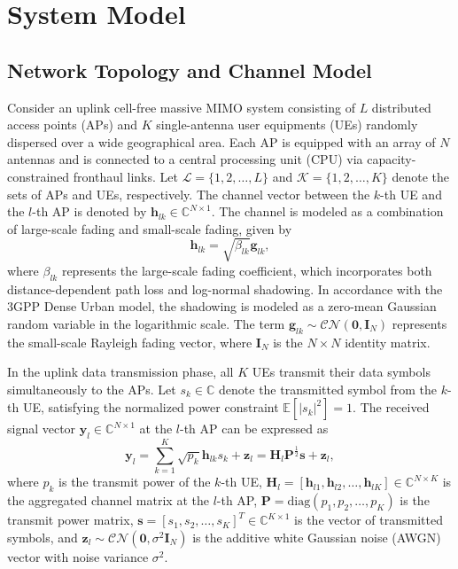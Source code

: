 \section{System Model}

\subsection{Network Topology and Channel Model}
Consider an uplink cell-free massive MIMO system consisting of $L$ distributed access points (APs) and $K$ single-antenna user equipments (UEs) randomly dispersed over a wide geographical area. Each AP is equipped with an array of $N$ antennas and is connected to a central processing unit (CPU) via capacity-constrained fronthaul links. Let $\mathcal{L} = \{1, 2, \dots, L\}$ and $\mathcal{K} = \{1, 2, \dots, K\}$ denote the sets of APs and UEs, respectively. The channel vector between the $k$-th UE and the $l$-th AP is denoted by $\mathbf{h}_{lk} \in \mathbb{C}^{N \times 1}$. The channel is modeled as a combination of large-scale fading and small-scale fading, given by
\begin{equation}
    \mathbf{h}_{lk} = \sqrt{\beta_{lk}} \mathbf{g}_{lk},
\end{equation}
where $\beta_{lk}$ represents the large-scale fading coefficient, which incorporates both distance-dependent path loss and log-normal shadowing. In accordance with the 3GPP Dense Urban model, the shadowing is modeled as a zero-mean Gaussian random variable in the logarithmic scale. The term $\mathbf{g}_{lk} \sim \mathcal{CN}(\mathbf{0}, \mathbf{I}_N)$ represents the small-scale Rayleigh fading vector, where $\mathbf{I}_N$ is the $N \times N$ identity matrix. 

In the uplink data transmission phase, all $K$ UEs transmit their data symbols simultaneously to the APs. Let $s_k \in \mathbb{C}$ denote the transmitted symbol from the $k$-th UE, satisfying the normalized power constraint $\mathbb{E}[|s_k|^2] = 1$. The received signal vector $\mathbf{y}_l \in \mathbb{C}^{N \times 1}$ at the $l$-th AP can be expressed as
\begin{equation}
    \mathbf{y}_l = \sum_{k=1}^{K} \sqrt{p_k} \mathbf{h}_{lk} s_k + \mathbf{z}_l = \mathbf{H}_l \mathbf{P}^{\frac{1}{2}} \mathbf{s} + \mathbf{z}_l,
\end{equation}
where $p_k$ is the transmit power of the $k$-th UE, $\mathbf{H}_l = [\mathbf{h}_{l1}, \mathbf{h}_{l2}, \dots, \mathbf{h}_{lK}] \in \mathbb{C}^{N \times K}$ is the aggregated channel matrix at the $l$-th AP, $\mathbf{P} = \text{diag}(p_1, p_2, \dots, p_K)$ is the transmit power matrix, $\mathbf{s} = [s_1, s_2, \dots, s_K]^T \in \mathbb{C}^{K \times 1}$ is the vector of transmitted symbols, and $\mathbf{z}_l \sim \mathcal{CN}(\mathbf{0}, \sigma^2 \mathbf{I}_N)$ is the additive white Gaussian noise (AWGN) vector with noise variance $\sigma^2$.

